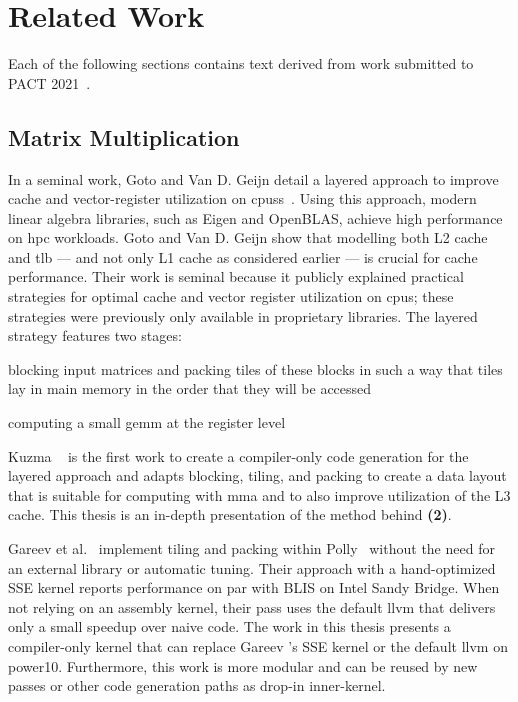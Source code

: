 \documentclass[\main/thesis.tex]{subfiles}
\begin{document}
\chapter{Related Work}
\label{cha:related}
Each of the following sections contains text derived from work submitted to PACT 2021~\autocite{kuzma2021fast}.

\section{Matrix Multiplication}
In a seminal work, Goto and Van D. Geijn detail a layered approach to improve cache and vector-register utilization on \glspl{cpu}s~\autocite{goto2008anatomy}.
Using this approach, modern linear algebra libraries, such as Eigen and OpenBLAS, achieve high performance on \gls{hpc} workloads.
Goto and Van D. Geijn show that modelling both L2 cache and \gls{tlb} --- and not only L1 cache as considered earlier --- is crucial for cache performance.
Their work is seminal because it publicly explained practical strategies for optimal cache and vector register utilization on \glspl{cpu}; these strategies were previously only available in proprietary libraries.
The layered strategy features two stages:
\begin{enumerate*}[itemjoin={{; }}, itemjoin*={{; and }}, label=\textbf{(\arabic*)}, after={.}]
  \item blocking input matrices and packing tiles of these blocks in such a way that tiles lay in main memory in the order that they will be accessed
  \item computing a small \gls{gemm} at the register level
\end{enumerate*}
Kuzma \etal~\autocite{kuzma2021fast} is the first work to create a compiler-only code generation for the layered approach and adapts blocking, tiling, and packing to create a data layout that is suitable for computing with \gls{mma} and to also improve utilization of the L3 cache.
This thesis is an in-depth presentation of the method behind \textbf{(2)}.

Gareev et al.~\autocite{gareev2018high} implement tiling and packing within Polly~\autocite{grosser2011polly,grosser2012polly} without the need for an external library or automatic tuning.
Their approach with a hand-optimized SSE kernel reports performance on par with BLIS on Intel Sandy Bridge.
When not relying on an assembly kernel, their pass uses the default \gls{llvm}  that delivers only a small speedup over naive code.
The work in this thesis presents a compiler-only kernel that can replace Gareev \etal's SSE kernel or the default \gls{llvm}  on \gls{power10}.
Furthermore, this work is more modular and can be reused by new passes or other code generation paths as drop-in inner-kernel.
\end{document}
